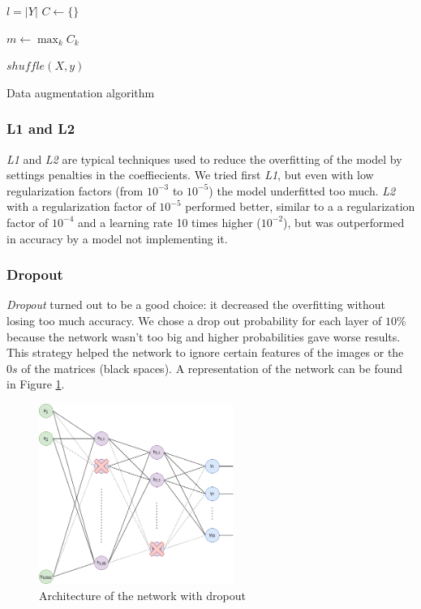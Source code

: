 \documentclass[compsoc]{IEEEtran}
\begin{document}
\begin{algorithm}[h]
\SetAlgoLined
{}
$l=|Y|$\;
$C \gets \{\}$\;


$m \gets \max_k C_k$\;

\Return $shuffle(X, y)$\;

\caption{Data augmentation algorithm}\label{alg:aug}
\end{algorithm}


\subsubsection{L1 and L2}
\emph{L1} and \emph{L2} are typical techniques used to reduce the overfitting of the model by settings penalties in the coeffiecients. We tried first \emph{L1}, but even with low regularization factors (from $10^{-3}$ to $10^{-5}$) the model underfitted too much. \emph{L2} with a regularization factor of $10^{-5}$ performed better, similar to a a regularization factor of $10^{-4}$ and a learning rate 10 times higher ($10^{-2}$), but was outperformed in accuracy by a model not implementing it.

\subsubsection{Dropout}
\emph{Dropout} turned out to be a good choice: it decreased the overfitting without losing too much accuracy. We chose a drop out probability for each layer of $10\%$ because the network wasn't too big and higher probabilities gave worse results. This strategy helped the network to ignore certain features of the images or the $0s$ of the matrices (black spaces). A representation of the network can be found in Figure \ref{fig:regffnn}. 

\begin{figure}[ht!]
\centering                                                                        
\includegraphics[width=2.5in]{regffnn.png}
\captionsetup{justification=centering}                                                                                                           
\caption{Architecture of the network with dropout}
\label{fig:regffnn}
\end{figure}
\end{document}
